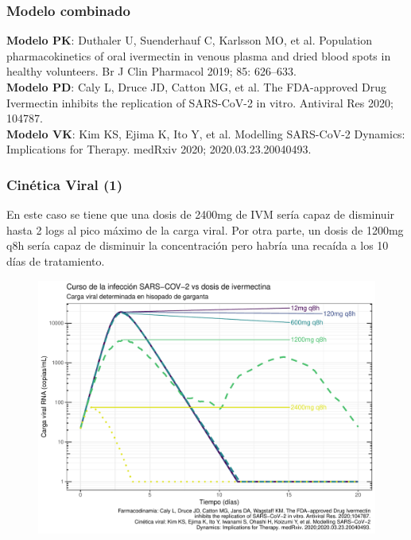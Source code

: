\documentclass[12pt,xcolor=dvipsnames]{beamer}
\begin{document}
	\begin{frame}
		\frametitle{Modelo combinado}
		\centering
		
		
		\bigskip
		\parbox[b]{1.0\textwidth}{\tiny \textbf{Modelo PK}: Duthaler U, Suenderhauf C, Karlsson MO, et al. Population pharmacokinetics of oral ivermectin in venous plasma and dried blood spots in healthy volunteers. Br J Clin Pharmacol 2019; 85: 626–633. \\
			\textbf{Modelo PD}: Caly L, Druce JD, Catton MG, et al. The FDA-approved Drug Ivermectin inhibits the replication of SARS-CoV-2 in vitro. Antiviral Res 2020; 104787.\\
			\textbf{Modelo VK}: Kim KS, Ejima K, Ito Y, et al. Modelling SARS-CoV-2 Dynamics: Implications for Therapy. medRxiv 2020; 2020.03.23.20040493.}
	\end{frame}
	
	\begin{frame}	
		\frametitle{Cinética Viral (1)}		
		\scriptsize
		En este caso se tiene que una dosis de 2400mg de IVM sería capaz de disminuir hasta 2 logs al pico máximo de la carga viral. Por otra parte, un dosis de 1200mg q8h sería capaz de disminuir la concentración pero habría una recaída a los 10 días de tratamiento. 
		
		\begin{figure}
			\centering
			\includegraphics[width=0.80\linewidth]{../modelo_PD_2/figuras/G3}
			\label{fig:g1}
		\end{figure}
	\end{frame}
\end{document}
